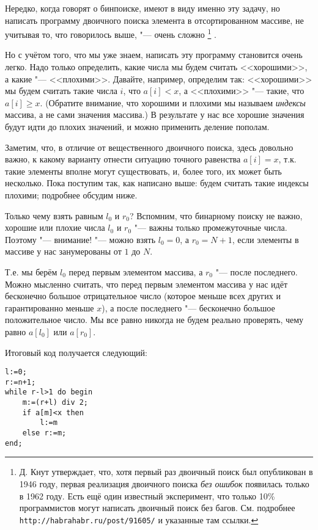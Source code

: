 Нередко, когда говорят о бинпоиске, имеют в виду именно эту задачу, но написать программу
двоичного поиска элемента в отсортированном массиве, не учитывая то, что говорилось выше,
"--- очень сложно%
\footnote{Д. Кнут утверждает, что, хотя первый раз двоичный поиск был опубликован в 1946 году,
первая реализация двоичного поиска \textit{без ошибок} появилась только в 1962 году. 
Есть ещё один известный эксперимент, что только 10\% программистов могут написать двоичный поиск без багов.
См. подробнее \texttt{http://habrahabr.ru/post/91605/} и указанные там ссылки.}%
.

Но с учётом того, что мы уже знаем, написать эту программу становится очень легко. 
Надо только определить, какие числа мы будем считать <<хорошими>>, а какие "--- <<плохими>>.
Давайте, например, определим так: <<хорошими>> мы будем считать такие числа $i$, что $a[i]<x$,
а <<плохими>> "--- такие, что $a[i]\geq x$. 
(Обратите внимание, что хорошими и плохими мы называем \textit{индексы} массива, а не сами значения массива.)
В результате у нас все хорошие значения будут идти до плохих значений, и можно применить деление пополам.

Заметим, что, в отличие от вещественного двоичного поиска, здесь довольно важно, к какому варианту 
отнести ситуацию точного равенства $a[i]=x$, т.к. такие элементы вполне могут существовать,
и, более того, их может быть несколько.
Пока поступим так, как написано выше: будем считать такие индексы плохими;
подробнее обсудим ниже.

Только чему взять равным $l_0$ и $r_0$?
Вспомним, что бинарному поиску не важно, хорошие или плохие числа $l_0$ и $r_0$ "---
важны только промежуточные числа. 
Поэтому "--- внимание! "--- можно взять $l_0=0$, а $r_0=N+1$, если элементы в массиве
у нас занумерованы от $1$ до $N$. 

Т.е. мы берём $l_0$ перед первым элементом массива, а $r_0$ "--- после последнего.
Можно мысленно считать, что перед первым элементом массива у нас идёт бесконечно большое отрицательное число
(которое меньше всех других и гарантированно меньше $x$), а после последнего "---
бесконечно большое положительное число.
Мы все равно никогда не будем реально проверять, чему равно $a[l_0]$ или $a[r_0]$.

Итоговый код получается следующий:
\begin{codesampleo}\begin{verbatim}
l:=0;
r:=n+1;  
while r-l>1 do begin    
    m:=(r+l) div 2;
    if a[m]<x then
        l:=m
    else r:=m;
end;
\end{verbatim}
\end{codesampleo}

